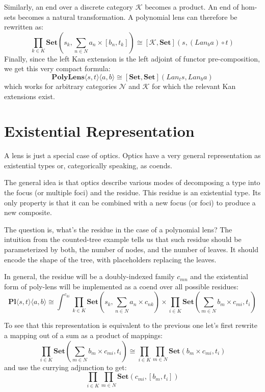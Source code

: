 \documentclass[11pt]{amsart}
\begin{document}
Similarly, an end over a discrete category $\mathcal{K}$ becomes a product. An end of hom-sets becomes a natural transformation. A polynomial lens can therefore be rewritten as:
\[ \prod_{k \in K} \mathbf{Set}\left(s_k, \sum_{n \in N} a_n \times [b_n, t_k] \right)  \cong [\mathcal{K}, \mathbf{Set}](s, (Lan_b a) \circ t) \]
Finally, since the left Kan extension is the left adjoint of functor pre-composition, we get this very compact formula:
\[  \mathbf{PolyLens}\langle s, t\rangle \langle a, b\rangle \cong [\mathbf{Set}, \mathbf{Set}](Lan_t s, Lan_b a) \]
which works for arbitrary categories $\mathcal{N}$ and $\mathcal{K}$ for which the relevant Kan extensions exist.

\section{Existential Representation}


A lens is just a special case of optics. Optics have a very general representation as existential types or, categorically speaking, as coends. 

The general idea is that optics describe various modes of decomposing a type into the focus (or multiple foci) and the residue. This residue is an existential type. Its only property is that it can be combined with a new focus (or foci) to produce a new composite.

The question is, what's the residue in the case of a polynomial lens? The intuition from the counted-tree example tells us that such residue should be parameterized by both, the number of nodes, and the number of leaves. It should encode the shape of the tree, with placeholders replacing the leaves. 

In general, the residue will be a doubly-indexed family $c_{m n}$ and the existential form of poly-lens will be implemented as a coend over all possible residues:
\[ \mathbf{Pl}\langle s, t\rangle \langle a, b\rangle \cong \int^{c_{k i}} 
 \prod_{k \in K} \mathbf{Set} \left(s_k,  \sum_{n \in N} a_n \times c_{n k} \right) \times 
 \prod_{i \in K}  \mathbf{Set} \left(\sum_{m \in N} b_m \times c_{m i}, t_i \right) \]

To see that this representation is equivalent to the previous one let's first rewrite a mapping out of a sum as a product of mappings:
\[ \prod_{i \in K}  \mathbf{Set} \left(\sum_{m \in N} b_m \times c_{m i}, t_i \right) \cong 
\prod_{i \in K} \prod_{m \in N} \mathbf{Set}\left(b_m \times c_{m i}, t_i \right)\]
and use the currying adjunction to get:
\[ \prod_{i \in K} \prod_{m \in N} \mathbf{Set}\left(c_{m i}, [b_m, t_i ]\right)\]
\end{document}
